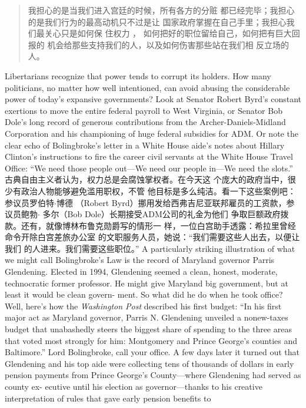 \begin{paracol}{2}
\begin{quote}
\end{quote}
\switchcolumn
\begin{quote}
我担心的是当我们进入宫廷的时候，所有各方的分赃
都已经完毕；我担心的是我们行为的最高动机只不过是让
国家政府掌握在自己手里；我担心我们最关心只是如何保
住权力 ， 如何把好的职位留给自己，如何把有巨大回报的
机会给那些支持我们的人，以及如何伤害那些站在我们相
反立场的人。
\end{quote}
\switchcolumn*
Libertarians recognize that power tends to corrupt its holders. How many politicians, no matter how well intentioned, can
avoid abusing the considerable power of today's expansive governments? Look at Senator Robert Byrd's constant exertions to
move the entire federal payroll to West Virginia, or Senator Bob
Dole's long record of generous contributions from the Archer-Daniels-Midland Corporation and his championing of huge
federal subsidies for ADM. Or note the clear echo of Bolingbroke's letter in a White House aide's notes about Hillary Clinton's instructions to fire the career civil servants at the White
House Travel Office: ``We need those people out---We need our
people in---We need the slots.''
\switchcolumn
古典自由主义者认为，权力总是会腐蚀掌权者。在今天这
个庞大的政府当中，很少有政治人物能够避免滥用职权，不管
他目标是多么纯洁。看一下这些案例吧：参议员罗伯特$\cdot$博德
（Robert Byrd）挪用发给西弗吉尼亚联邦雇员的工资款，参议员鲍勃$\cdot$ 多尔（Bob Dole）长期接受ADM公司的礼金为他们
争取巨额政府拨款。还有，就像博林布鲁克勋爵写的情形一
样，一位白宫助手透露：希拉里曾经命令开除白宫差旅办公室
的文职服务人员，她说：“我们需要这些人出去，以便让我们
的人进来。我们需要这些职位。”
\switchcolumn*
A particularly striking illustration of what we might call Bolingbroke's Law is the record of Maryland governor Parris Glendening. Elected in 1994, Glendening seemed a clean, honest,
moderate, technocratic former professor. He might give Maryland big government, but at least it would be clean govern-
ment. So what did he do when he took office? Well, here's how
the \textit{Washington Post} described his first budget: ``In his first major
act as Maryland governor, Parris N. Glendening unveiled a nonew-taxes budget that unabashedly steers the biggest share of
spending to the three areas that voted most strongly for him:
Montgomery and Prince George's counties and Baltimore.''
Lord Bolingbroke, call your office. A few days later it turned
out that Glendening and his top aide were collecting tens of
thousands of dollars in early pension payments from Prince
George's County---where Glendening had served as county ex-
ecutive until his election as governor---thanks to his creative interpretation of rules that gave early pension benefits to

\end{paracol}
